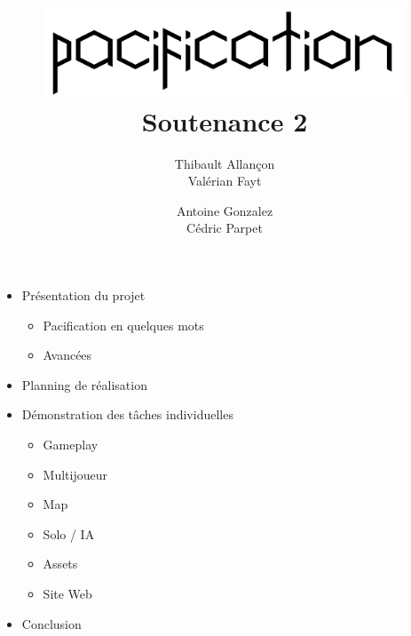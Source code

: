 \documentclass[14pt]{extarticle}
\title{
	{\protect\centering\protect\includegraphics[width=0.8\textwidth]{pacification_logo.png}}\\
	{Soutenance 2}\\
}
\author{
	Thibault Allançon\\
	Valérian Fayt
	\and
	Antoine Gonzalez\\
	Cédric Parpet}
\begin{document}
\maketitle
\vspace{1em}

\begin{itemize}
    \item Présentation du projet
    \begin{itemize}
        \item Pacification en quelques mots
        \item Avancées
    \end{itemize}

    \item Planning de réalisation

    \item Démonstration des tâches individuelles
    \begin{itemize}
        \item Gameplay
        \item Multijoueur
        \item Map
	\item Solo / IA
        \item Assets
	\item Site Web
    \end{itemize}

    \item Conclusion
\end{itemize}
\end{document}
